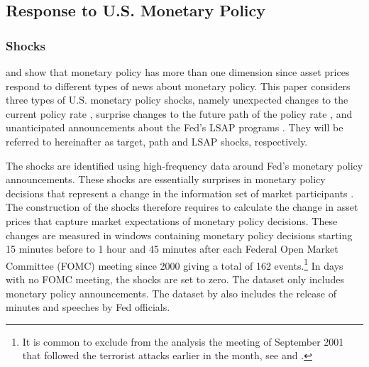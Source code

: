 {\subsection{Response to U.S. Monetary Policy} %

\subsubsection{Shocks} \label{sec:USMPS}
\iftoggle{toclinks}{\gototoc}{} %

\cite{GSS:2005a} and \cite{Swanson:2018} show that monetary policy has more than one dimension since asset prices respond to different types of news about monetary policy.
This paper considers three types of U.S. monetary policy shocks, namely
unexpected changes to the current policy rate \citep{Kuttner:2001}, surprise changes to the future path of the policy rate \citep{GSS:2005a}, and unanticipated announcements about the Fed's LSAP programs \citep{Swanson:2018}. 
They will be referred to hereinafter as target, path and LSAP shocks, respectively.

The shocks are identified using high-frequency data around Fed's monetary policy announcements.
These shocks are essentially surprises in monetary policy decisions that represent a change in the information set of market participants \citep{GurkaynakWright:2013,NakamuraSteinsson:2018JEP}.
The construction of the shocks therefore requires to calculate the change in asset prices that capture market expectations of monetary policy decisions.
These changes are measured in windows containing monetary policy decisions starting 15 minutes before to 1 hour and 45 minutes after each Federal Open Market Committee (FOMC) meeting since 2000 giving a total of 162 events.\footnote{ It is common to exclude from the analysis the meeting of September 2001 that followed the terrorist attacks earlier in the month, see \cite{GSS:2005a} and \cite{NakamuraSteinsson:2018JEP}.}
In days with no FOMC meeting, the shocks are set to zero.
The dataset only includes monetary policy announcements.
The dataset by \cite{FerrariKearnsSchrimpf:2017} also includes the release of minutes and speeches by Fed officials.

}
